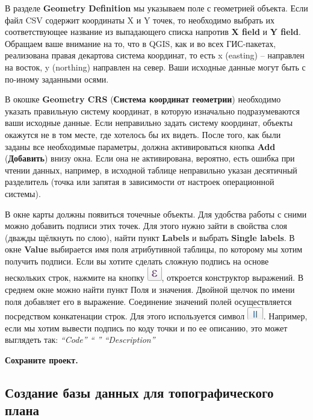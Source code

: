 \documentclass[
  12pt,
]{book}
\begin{document}
В разделе \textbf{Geometry Definition} мы указываем поле с геометрией объекта. Если файл CSV содержит координаты X и Y точек, то необходимо выбрать их соответствующее название из выпадающего списка напротив \textbf{X field} и \textbf{Y field}. Обращаем ваше внимание на то, что в QGIS, как и во всех ГИС-пакетах, реализована правая декартова система координат, то есть x (easting) -- направлен на восток, y (northing) направлен на север. Ваши исходные данные могут быть с по-иному заданными осями.

В окошке \textbf{Geometry CRS} (\textbf{Система координат геометрии}) необходимо указать правильную систему координат, в которую изначально подразумеваются ваши исходные данные. Если неправильно задать систему координат, объекты окажутся не в том месте, где хотелось бы их видеть.
После того, как были заданы все необходимые параметры, должна активироваться кнопка \textbf{Add} (\textbf{Добавить}) внизу окна. Если она не активирована, вероятно, есть ошибка при чтении данных, например, в исходной таблице неправильно указан десятичный разделитель (точка или запятая в зависимости от настроек операционной системы).

В окне карты должны появиться точечные объекты. Для удобства работы с сними можно добавить подписи этих точек. Для этого нужно зайти в свойства слоя (дважды щёлкнуть по слою), найти пункт \textbf{Labels} и выбрать \textbf{Single labels}. В окне \textbf{Value} выбирается имя поля атрибутивной таблицы, по которому мы хотим получить подписи. Если вы хотите сделать сложную подпись на основе нескольких строк, нажмите на кнопку \includegraphics{images/Practice/Expression.png}, откроется конструктор выражений. В среднем окне можно найти пункт Поля и значения. Двойной щелчок по имени поля добавляет его в выражение. Соединение значений полей осуществляется посредством конкатенации строк. Для этого используется символ \includegraphics{images/Practice/Concatenation.png}. Например, если мы хотим вывести подпись по коду точки и по ее описанию, это может выглядеть так:
\emph{``Code'' \textbar\textbar{} `` '' ``Description''}

\textbf{Сохраните проект.}

\subsection{Создание базы данных для топографического плана}\label{practice-topo-database}
\end{document}
